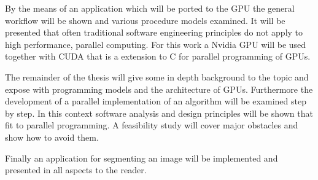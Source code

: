 By the means of an application which will be ported to the \gls{GPU} the general
workflow will be shown and various procedure models examined. It will be
presented that often traditional software engineering principles do not
apply to high performance, parallel computing. For this work a Nvidia \gls{GPU} will
be used together with \gls{CUDA} that is a
extension to C for parallel programming of \glspl{GPU}. 

The remainder of the thesis will give some in depth background to the topic and
expose with programming models and the architecture of \glspl{GPU}. Furthermore the
development of a parallel implementation of an algorithm will be examined step
by step. In this context software analysis and design principles will be shown
that fit to parallel programming. A feasibility study will cover major obstacles
and show how to avoid them.

Finally an application for segmenting an image will be implemented and presented
in all aspects to the reader.
